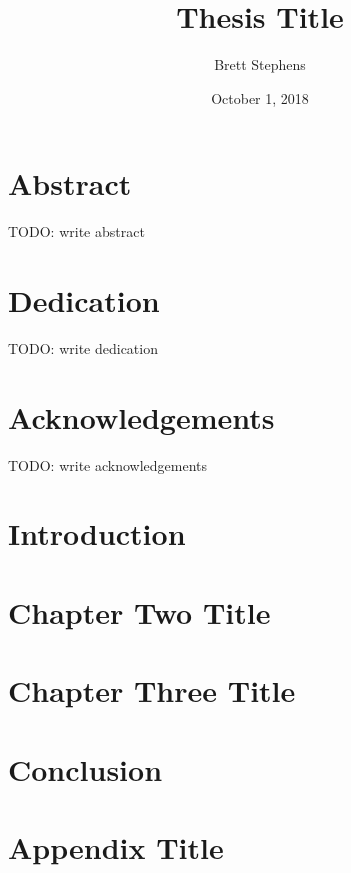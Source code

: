 \documentclass[12pt,twoside]{report}
\title{Thesis Title}
\author{Brett Stephens}
\date{October 1, 2018}
\begin{document}




\chapter*{Abstract}
TODO: write abstract

\chapter*{Dedication}
TODO: write dedication

\chapter*{Acknowledgements}
TODO: write acknowledgements 

\tableofcontents

\chapter{Introduction}


\chapter{Chapter Two Title}


\chapter{Chapter Three Title}


\chapter{Conclusion}


\appendix
\chapter{Appendix Title}


\printbibliography
\end{document}
